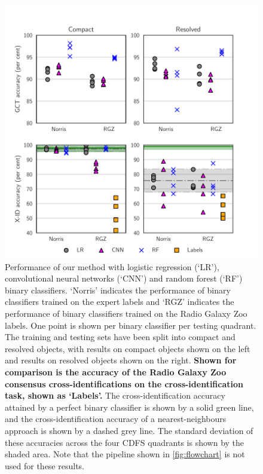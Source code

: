 \documentclass[fleqn,usenatbib,usedcolumn]{mnras}
\newcommand{\edited}[1]{{\bf {#1}}}
\begin{document}
    \begin{figure}
    \centering
    \includegraphics[]{images/cdfs-grid-new.pdf}
    \caption{Performance of our method with logistic regression (`LR'), convolutional neural networks (`CNN') and random forest (`RF') binary classifiers. `Norris' indicates the performance of binary classifiers trained on the expert labels and `RGZ' indicates the performance of binary classifiers trained on the Radio Galaxy Zoo labels. One point is shown per binary classifier per testing quadrant. The training and testing sets have been split into compact and resolved objects, with results on compact objects shown on the left and results on resolved objects shown on the right. \edited{Shown for comparison is the accuracy of the Radio Galaxy Zoo consensus cross-identifications on the cross-identification task, shown as `Labels'.} The cross-identification accuracy attained by a perfect binary classifier is shown by a solid green line, and the cross-identification accuracy of a nearest-neighbours approach is shown by a dashed grey line. The standard deviation of these accuracies across the four CDFS quadrants is shown by the shaded area. Note that the pipeline shown in \autoref{fig:flowchart} is not used for these results. \label{fig:ba}}
    \end{figure}
\end{document}
